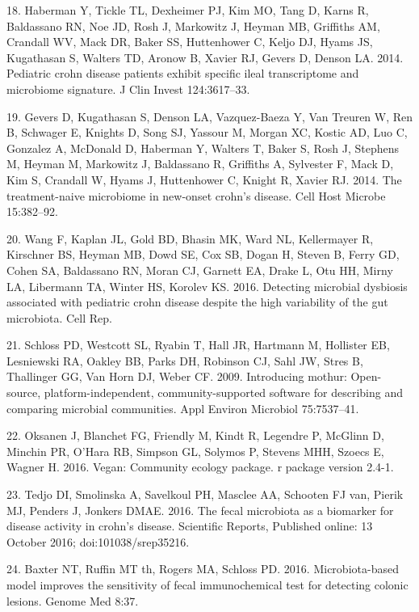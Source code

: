 \documentclass[11pt,]{article}
\begin{document}
\hypertarget{ref-haberman_pedsCD_2014}{}
18. Haberman Y, Tickle TL, Dexheimer PJ, Kim MO, Tang D, Karns R,
Baldassano RN, Noe JD, Rosh J, Markowitz J, Heyman MB, Griffiths AM,
Crandall WV, Mack DR, Baker SS, Huttenhower C, Keljo DJ, Hyams JS,
Kugathasan S, Walters TD, Aronow B, Xavier RJ, Gevers D, Denson LA.
2014. Pediatric crohn disease patients exhibit specific ileal
transcriptome and microbiome signature. J Clin Invest 124:3617--33.

\hypertarget{ref-gevers_pedsCD_2014}{}
19. Gevers D, Kugathasan S, Denson LA, Vazquez-Baeza Y, Van Treuren W,
Ren B, Schwager E, Knights D, Song SJ, Yassour M, Morgan XC, Kostic AD,
Luo C, Gonzalez A, McDonald D, Haberman Y, Walters T, Baker S, Rosh J,
Stephens M, Heyman M, Markowitz J, Baldassano R, Griffiths A, Sylvester
F, Mack D, Kim S, Crandall W, Hyams J, Huttenhower C, Knight R, Xavier
RJ. 2014. The treatment-naive microbiome in new-onset crohn's disease.
Cell Host Microbe 15:382--92.

\hypertarget{ref-wang_pedsCD_2016}{}
20. Wang F, Kaplan JL, Gold BD, Bhasin MK, Ward NL, Kellermayer R,
Kirschner BS, Heyman MB, Dowd SE, Cox SB, Dogan H, Steven B, Ferry GD,
Cohen SA, Baldassano RN, Moran CJ, Garnett EA, Drake L, Otu HH, Mirny
LA, Libermann TA, Winter HS, Korolev KS. 2016. Detecting microbial
dysbiosis associated with pediatric crohn disease despite the high
variability of the gut microbiota. Cell Rep.

\hypertarget{ref-schloss_mothur_2009}{}
21. Schloss PD, Westcott SL, Ryabin T, Hall JR, Hartmann M, Hollister
EB, Lesniewski RA, Oakley BB, Parks DH, Robinson CJ, Sahl JW, Stres B,
Thallinger GG, Van Horn DJ, Weber CF. 2009. Introducing mothur:
Open-source, platform-independent, community-supported software for
describing and comparing microbial communities. Appl Environ Microbiol
75:7537--41.

\hypertarget{ref-oksanen_vegan_2016}{}
22. Oksanen J, Blanchet FG, Friendly M, Kindt R, Legendre P, McGlinn D,
Minchin PR, O'Hara RB, Simpson GL, Solymos P, Stevens MHH, Szoecs E,
Wagner H. 2016. Vegan: Community ecology package. r package version
2.4-1.

\hypertarget{ref-tedjo_CDactivity_2016}{}
23. Tedjo DI, Smolinska A, Savelkoul PH, Masclee AA, Schooten FJ van,
Pierik MJ, Penders J, Jonkers DMAE. 2016. The fecal microbiota as a
biomarker for disease activity in crohn's disease. Scientific Reports,
Published online: 13 October 2016; doi:101038/srep35216.

\hypertarget{ref-baxter_FIT_2016}{}
24. Baxter NT, Ruffin MT th, Rogers MA, Schloss PD. 2016.
Microbiota-based model improves the sensitivity of fecal immunochemical
test for detecting colonic lesions. Genome Med 8:37.
\end{document}
